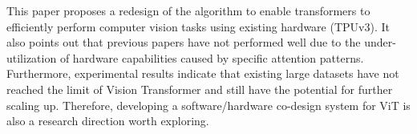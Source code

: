 \documentclass[12pt]{article}
\begin{document}
This paper proposes a redesign of the algorithm to enable transformers to efficiently perform computer vision tasks using existing hardware (TPUv3). It also points out that previous papers have not performed well due to the under-utilization of hardware capabilities caused by specific attention patterns. Furthermore, experimental results indicate that existing large datasets have not reached the limit of Vision Transformer and still have the potential for further scaling up. Therefore, developing a software/hardware co-design system for ViT is also a research direction worth exploring.


\printbibliography
\end{document}
